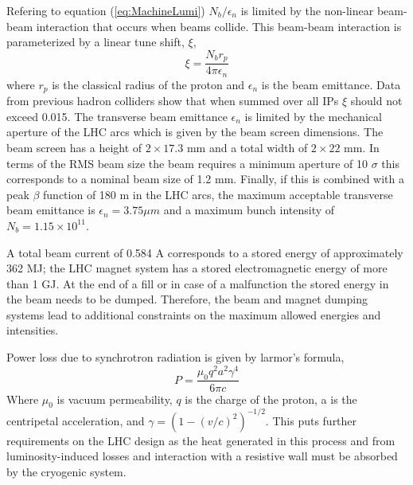 Refering to equation (\ref{eq:MachineLumi}) 
$N_{b}/\epsilon_{n}$ is limited by the %
non-linear beam-beam interaction that occurs when beams collide. This
beam-beam interaction is parameterized by a linear tune shift, $\xi$, 
\begin{equation}
\xi=\frac{N_{b}r_{p}}{4\pi\epsilon_{n}}
\end{equation}
where $r_{p}$ is the classical radius of the proton
and $\epsilon_{n}$ is the beam emittance.
Data from previous hadron colliders show that when summed over
all IPs $\xi$ should not exceed 0.015. %
The transverse beam emittance $\epsilon_{n}$ is limited by the 
mechanical aperture of the LHC arcs which is given by the beam screen dimensions.
The beam screen has a height of $2 \times 17.3$ mm and a total width
of $2 \times 22$ mm. In terms of the RMS beam size 
the beam requires a minimum aperture of 10 $\sigma$ this corresponds to a 
nominal beam size of 1.2 mm. Finally, if this is combined with a
peak $\beta$ function of 180 m in the LHC arcs, the maximum acceptable
transverse beam emittance is $\epsilon_{n}=3.75 \mu m$ and a 
maximum bunch intensity of $N_{b}=1.15 \times 10^{11}$.

A total beam current of 0.584 A corresponds to a stored energy
of approximately 362 MJ; the LHC magnet system has a stored
electromagnetic energy of more than 1 GJ.
At the end of a fill or in case of a malfunction the stored
energy in the beam needs to be dumped. Therefore, the beam
and magnet dumping systems lead to additional constraints
on the maximum allowed energies and intensities.

Power loss due to synchrotron radiation is given by larmor's formula,
\begin{equation}
P=\frac{\mu_{0}q^{2}a^{2}\gamma^{4}}{6\pi c}
\end{equation}
Where $\mu_{0}$ is vacuum permeability, 
$q$ is the charge of the proton, 
a is the centripetal acceleration, 
and $\gamma=(1-(v/c)^{2})^{-1/2}$.
This puts further requirements on the LHC design as the heat generated in this process and
 from luminosity-induced losses and interaction with a resistive wall 
must be absorbed by the cryogenic system.

